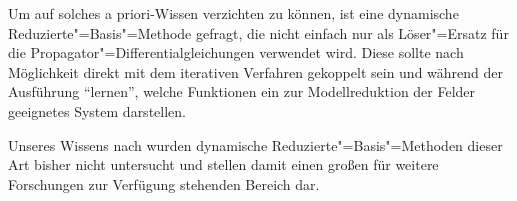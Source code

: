 \documentclass[../main.tex]{subfiles}
\begin{document}
Um auf solches a priori-Wissen verzichten zu können, ist eine dynamische Reduzierte"=Basis"=Methode gefragt, die nicht einfach nur als Löser"=Ersatz für die Propagator"=Differentialgleichungen verwendet wird.
Diese sollte nach Möglichkeit direkt mit dem iterativen Verfahren gekoppelt sein und während der Ausführung \enquote{lernen}, welche Funktionen ein zur Modellreduktion der Felder geeignetes System darstellen.

Unseres Wissens nach wurden dynamische Reduzierte"=Basis"=Methoden dieser Art bisher nicht untersucht und stellen damit einen großen für weitere Forschungen zur Verfügung stehenden Bereich dar.
\end{document}
